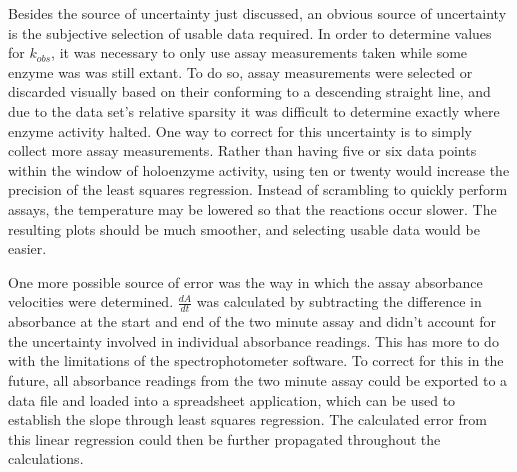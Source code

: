 Besides the source of uncertainty just discussed, an obvious source of uncertainty is the subjective selection of usable data required. In order to determine values for $k_{obs}$, it was necessary to only use assay measurements taken while some enzyme was was still extant. To do so, assay measurements were selected or discarded visually based on their conforming to a descending straight line, and due to the data set's relative sparsity it was difficult to determine exactly where enzyme activity halted. One way to correct for this uncertainty is to simply collect more assay measurements. Rather than having five or six data points within the window of holoenzyme activity, using ten or twenty would increase the precision of the least squares regression. Instead of scrambling to quickly perform assays, the temperature may be lowered so that the reactions occur slower. The resulting plots should be much smoother, and selecting usable data would be easier.

One more possible source of error was the way in which the assay absorbance velocities were determined. $\frac{dA}{dt}$ was calculated by subtracting the difference in absorbance at the start and end of the two minute assay and didn't account for the uncertainty involved in individual absorbance readings. This has more to do with the limitations of the spectrophotometer software. To correct for this in the future, all absorbance readings from the two minute assay could be exported to a data file and loaded into a spreadsheet application, which can be used to establish the slope through least squares regression. The calculated error from this linear regression could then be further propagated throughout the calculations. 